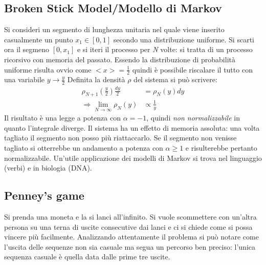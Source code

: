 \documentclass[12pt, a4paper]{book}
\theoremstyle{theorem}
\begin{document}
			\subsection{Broken Stick Model/Modello di Markov}
				Si consideri un segmento di lunghezza unitaria nel quale viene inserito casualmente un punto $x_1\in[0,1]$ secondo una distribuzione uniforme.
				Si scarti ora il segmeno $[0,x_1]$ e si iteri il processo per \textit{N} volte: si tratta di un processo ricorsivo con memoria del passato.
				Essendo la distribuzione di probabilità uniforme risulta ovvio come $<x>=\frac{1}{2}$ quindi è possibile riscalare il tutto con una variabile $y\rightarrow\frac{y}{2}$
				Definita la densità $\rho$ del sistema si può scrivere:
				\begin{equation}
					\begin{split}
						\rho_{N+1}\left(\frac{y}{2}\right)\frac{dy}{2}&=\rho_N(y)dy\\
						\Rightarrow\lim_{N\to\infty}\rho_N(y)&\propto\frac{1}{y}
					\end{split}
				\end{equation}
				Il risultato è una legge a potenza con $\alpha=-1$, quindi \textit{non normalizzabile} in quanto l'integrale diverge.
				Il sistema ha un effetto di memoria assoluta: una volta tagliato il segmento non posso più riattaccarlo.
				Se il segmento non venisse tagliato si otterrebbe un andamento a potenza con $\alpha\geq 1$ e risulterebbe pertanto normalizzabile.
				Un'utile applicazione dei modelli di Markov si trova nel linguaggio (verbi) e in biologia (DNA).
			\subsection{Penney's game}
				Si prenda una moneta e la si lanci all'infinito.
				Si vuole scommettere con un'altra persona su una terna di uscite consecutive dai lanci e ci si chiede come si possa vincere più facilmente.
				Analizzando attentamente il problema si può notare come l'uscita delle sequenze non sia casuale ma segua un percorso ben preciso: l'unica sequenza casuale è quella data dalle prime tre uscite.
							
\end{document}
